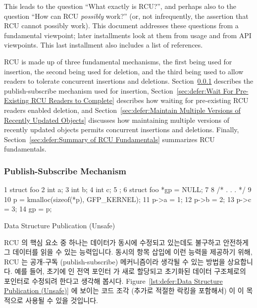 This leads to the question ``What exactly is RCU?'', and perhaps also
to the question ``How can RCU \emph{possibly} work?'' (or, not
infrequently, the assertion that RCU cannot possibly work).
This document addresses these questions from a fundamental viewpoint;
later installments look at them from usage and from API viewpoints.
This last installment also includes a list of references.

RCU is made up of three fundamental mechanisms, the first being
used for insertion, the second being used for deletion, and the third
being used to allow readers to tolerate concurrent insertions and deletions.
Section~\ref{sec:defer:Publish-Subscribe Mechanism}
describes the publish-subscribe mechanism used for insertion,
Section~\ref{sec:defer:Wait For Pre-Existing RCU Readers to Complete}
describes how waiting for pre-existing RCU readers enabled deletion,
and
Section~\ref{sec:defer:Maintain Multiple Versions of Recently Updated Objects}
discusses how maintaining multiple versions of recently updated objects
permits concurrent insertions and deletions.
Finally,
Section~\ref{sec:defer:Summary of RCU Fundamentals}
summarizes RCU fundamentals.
\fi

\subsubsection{Publish-Subscribe Mechanism}
\label{sec:defer:Publish-Subscribe Mechanism}

\begin{listing}[tbp]
{ \scriptsize
\begin{verbbox}
  1 struct foo {
  2   int a;
  3   int b;
  4   int c;
  5 };
  6 struct foo *gp = NULL;
  7
  8 /* . . . */
  9
 10 p = kmalloc(sizeof(*p), GFP_KERNEL);
 11 p->a = 1;
 12 p->b = 2;
 13 p->c = 3;
 14 gp = p;
\end{verbbox}
}
\centering
\theverbbox
\caption{Data Structure Publication (Unsafe)}
\label{lst:defer:Data Structure Publication (Unsafe)}
\end{listing}

RCU 의 핵심 요소 중 하나는 데이터가 동시에 수정되고 있는데도 불구하고 안전하게
그 데이터를 읽을 수 있는 능력입니다.
동시의 항목 삽입에 이런 능력을 제공하기 위해, RCU 는 공개-구독
(publish-subscribe) 메커니즘이라 생각될 수 있는 방법을 상요합니다.
예를 들어, 초기에  인 전역 포인터  가 새로 할당되고 초기화된
데이터 구조체로의 포인터로 수정되려 한다고 생각해 봅시다.
Figure~\ref{lst:defer:Data Structure Publication (Unsafe)} 에 보이는 코드 조각
(추가로 적절한 락킹을 포함해서) 이 이 목적으로 사용될 수 있을 것입니다.
\iffalse

